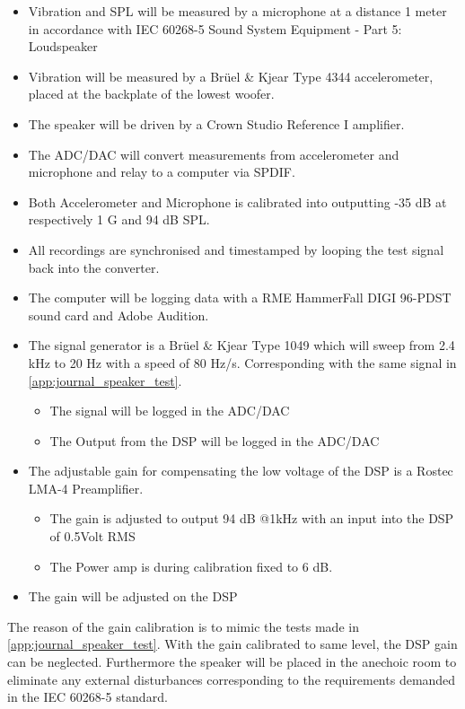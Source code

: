\begin{itemize}
\item Vibration and \gls{SPL} will be measured by a microphone at a distance 1 meter in accordance with IEC 60268-5 Sound System Equipment - Part 5: Loudspeaker
\item Vibration will be measured by a Brüel \& Kjear Type 4344 accelerometer, placed at the backplate of the lowest woofer.
\item The speaker will be driven by a Crown Studio Reference I amplifier.
\item The ADC/DAC will convert measurements from accelerometer and microphone and relay to a computer via SPDIF.
\item Both Accelerometer and Microphone is calibrated into outputting -35 dB at respectively 1 G and 94 dB \gls{SPL}.
\item All recordings are synchronised and timestamped by looping the test signal back into the converter.
\item The computer will be logging data with a RME HammerFall DIGI 96-PDST sound card and Adobe Audition.
\item The signal generator is a Brüel \& Kjear Type 1049 which will sweep from 2.4 kHz to 20 Hz with a speed of 80 Hz/s. Corresponding with the same signal in \autoref{app:journal_speaker_test}.
\begin{itemize}
	\item The signal will be logged in the ADC/DAC
	\item The Output from the DSP will be logged in the ADC/DAC
\end{itemize}
\item The adjustable gain for compensating the low voltage of the DSP is a Rostec LMA-4 Preamplifier.
\begin{itemize}
	\item The gain is adjusted to output 94 dB @1kHz with an input into the DSP of 0.5Volt RMS
	\item The Power amp is during calibration fixed to 6 dB.
\end{itemize}
\item The gain will be adjusted on the DSP
\end{itemize}

The reason of the gain calibration is to mimic the tests made in \autoref{app:journal_speaker_test}. With the gain calibrated to same level, the DSP gain can be neglected. Furthermore the speaker will be placed in the anechoic room to eliminate any external disturbances corresponding to the requirements demanded in the IEC 60268-5 standard.

